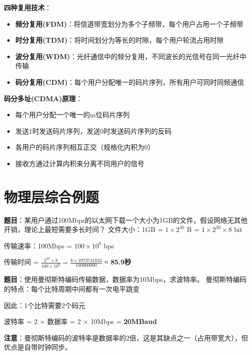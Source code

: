 \textbf{四种复用技术}：
\begin{itemize}[leftmargin=2em,itemsep=0pt]
    \item \textbf{频分复用(FDM)}：将信道带宽划分为多个子频带，每个用户占用一个子频带
    \item \textbf{时分复用(TDM)}：将时间划分为等长的时隙，每个用户轮流占用时隙
    \item \textbf{波分复用(WDM)}：光纤通信中的频分复用，不同波长的光信号在同一光纤中传输
    \item \textbf{码分复用(CDM)}：每个用户分配唯一的码片序列，所有用户可同时同频通信
\end{itemize}

\begin{tipbox}
\textbf{码分多址(CDMA)原理}：
\begin{itemize}[itemsep=0pt]
    \item 每个用户分配一个唯一的m位码片序列
    \item 发送1时发送码片序列，发送0时发送码片序列的反码
    \item 各用户的码片序列相互正交（规格化内积为0）
    \item 接收方通过计算内积来分离不同用户的信号
\end{itemize}
\end{tipbox}

\section{物理层综合例题}

\begin{examplebox}[例题2.4 数据传输时间]
\textbf{题目}：某用户通过100Mbps的以太网下载一个大小为1GB的文件，假设网络无其他开销，理论上最短需要多长时间？
\tcblower
文件大小：1GB = $1 \times 2^{30}$ B = $1 \times 2^{30} \times 8$ bit

传输速率：100Mbps = $100 \times 10^6$ bps

传输时间 = $\frac{2^{30} \times 8}{100 \times 10^6} = \frac{8 \times 1073741824}{100000000}$ ≈ \textbf{85.9秒}
\end{examplebox}

\begin{examplebox}[例题2.5 曼彻斯特编码]
\textbf{题目}：使用曼彻斯特编码传输数据，数据率为10Mbps，求波特率。
\tcblower
曼彻斯特编码的特点：每个比特周期中间都有一次电平跳变

因此：1个比特需要2个码元

波特率 = 2 × 数据率 = 2 × 10Mbps = \textbf{20MBaud}

\textbf{注意}：曼彻斯特编码的波特率是数据率的2倍，这是其缺点之一（占用带宽大），但优点是自带时钟同步。
\end{examplebox}


